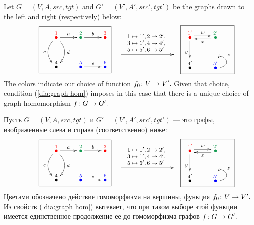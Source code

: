 \documentclass[../main/CT4S-EN-RU]{subfiles}
\begin{document}
\begin{exampleENG}\label{ex:graph hom}
Let $G=(V,A,src,tgt)$ and $G'=(V',A',src',tgt')$ be the graphs drawn to the left and right (respectively) below:
\begin{align}\label{dia:graph hom example}
\parbox{1.5in}{\fbox{\xymatrix{\LMO{\color{red}{1}}\ar[r]^a\ar@/^1pc/[d]^d\ar@/_1pc/[d]_c&\LMO{\color{ForestGreen}{2}}\ar[r]^b&\LMO{\color{red}{3}}\\\LMO{4}&\LMO{\color{blue}{5}}\ar[r]^e&\LMO{\color{blue}{6}}}}}
\parbox{1in}{\xymatrix{~\ar[rr]^{\parbox{.8in}{\vspace{-.2in}\footnotesize$1\mapsto 1', 2\mapsto 2',\\ 3\mapsto 1',4\mapsto 4',\\ 5\mapsto 5',6\mapsto5'$}}&\hsp&~}}
\parbox{.8in}{\fbox{\xymatrix{\LMO{\color{red}{1'}}\ar@<.5ex>[r]^w\ar[d]_y&\LMO{\color{ForestGreen}{2'}}\ar@<.5ex>[l]^x\\\LMO{4'}&\LMO{\color{blue}{5'}}\ar@(r,u)[]_z}}}
\end{align}
The colors indicate our choice of function $f_0\colon V\rightarrow V'.$ Given that choice, condition (\ref{dia:graph hom}) imposes in this case that there is a unique choice of graph homomorphism $f\colon G\rightarrow G'.$ 
\end{exampleENG}

\begin{exampleRUS}\label{ex:graph hom}
Пусть $G=(V,A,src,tgt)$ и $G'=(V',A',src',tgt')$ — это графы, изображенные слева и справа (соответственно) ниже:
\begin{align}\label{dia:graph hom example}
\parbox{1.5in}{\fbox{\xymatrix{
    \LMO{\color{red}{1}} \ar[r]^a \ar@/^1pc/[d]^d \ar@/_1pc/[d]_c  &  \LMO{\color{ForestGreen}{2}} \ar[r]^b  &  \LMO{\color{red}{3}}  \\
    \LMO{4}  &  \LMO{\color{blue}{5}} \ar[r]^e  &  \LMO{\color{blue}{6}}
}}}
\parbox{1in}{\xymatrix{
    ~ \ar[rr]^{\parbox{.8in}{
        \vspace{-.2in}\footnotesize$1\mapsto 1', 2\mapsto 2',\\ 3\mapsto 1',4\mapsto 4',\\ 5\mapsto 5',6\mapsto5'$
    }}  &  \hsp  &  ~
}}
\parbox{.8in}{\fbox{\xymatrix{
    \LMO{\color{red}{1'}} \ar@<.5ex>[r]^w \ar[d]_y  &  \LMO{\color{ForestGreen}{2'}} \ar@<.5ex>[l]^x  \\
    \LMO{4'}  &  \LMO{\color{blue}{5'}} \ar@(r,u)[]_z
}}}
\end{align}
Цветами обозначено действие гомоморфизма на вершины, функция $f_0\colon V\rightarrow V'.$ Из свойств (\ref{dia:graph hom}) вытекает, что при таком выборе этой функции имеется единственное продолжение ее до гомоморфизма графов $f\colon G\rightarrow G'.$ 
\end{exampleRUS}
\end{document}
